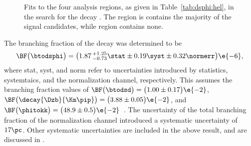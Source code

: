 \begin{figure}
  \begin{center}
    \caption[Fits to \btodsphi data]
    {
      Fits to the four analysis regions, as given in Table~\ref{tab:dsphi:hel}, in the search for
      the decay \btodsphi.
      The region \rA is contains the majority of the signal candidates, while region \rD contains
      none.
    }
    \label{fig:dsphi:fits}
  \end{center}
\end{figure}

The branching fraction of the decay \btodsphi was determined to be
\begin{equation}
  \BF\big(\btodsphi\big) =
  \big(1.87\,^{+1.25}_{-0.73}\stat\pm0.19\syst\pm0.32\normerr\big)\e{-6},
  \label{eq:dsphi:result}
\end{equation}
where stat, syst, and norm refer to uncertainties introduced by statistics, systemtaics, and the
normalization channel, respectively.
This assumes the branching fraction values of
$\BF\big(\btodsd\big)=\big(1.00\pm0.17\big)\e{-2}$,
$\BF\big(\decay{\Dzb}{\Km\pip}\big)=\big(3.88\pm0.05\big)\e{-2}$, and
$\BF\big(\phitokk\big)=\big(48.9\pm0.5\big)\e{-2}$~\cite{PDG2012}.
The uncertainty of the total branching fraction of the normalization channel introduced a systematic
uncertainty of $17\pc$.
Other systematic uncertainties are included in the above result, and are discussed in
.






